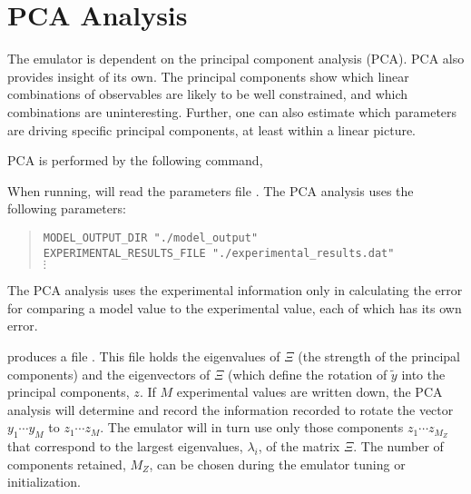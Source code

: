 \section{PCA Analysis}\label{sec:pca}

The emulator is dependent on the principal component analysis (PCA). PCA also provides insight of its own. The principal components show which linear combinations of observables are likely to be well constrained, and which combinations are uninteresting. Further, one can also estimate which parameters are driving specific principal components, at least within a linear picture.

PCA is performed by the following command,


When running,  will read the parameters file . The PCA analysis uses the following parameters:

\vspace*{-8pt}\begin{quote}
{\tt MODEL\_OUTPUT\_DIR "./model\_output"}\\
{\tt EXPERIMENTAL\_RESULTS\_FILE "./experimental\_results.dat"}\\
$\vdots$
\end{quote}\vspace*{-8pt}
The PCA analysis uses the experimental information only in calculating the error for comparing a model value to the experimental value, each of which has its own error.

 produces a file . This file holds the eigenvalues of $\Xi$ (the strength of the principal components) and the eigenvectors of $\Xi$ (which define the rotation of $\tilde{y}$ into the principal components, $z$. If $M$ experimental values are written down, the PCA analysis will determine and record the information recorded to rotate the vector $y_1\cdots y_M$ to $z_1\cdots z_M$. The emulator will in turn use only those components $z_1\cdots z_{M_Z}$ that correspond to the largest eigenvalues, $\lambda_i$, of the matrix $\Xi$. The number of components retained, $M_Z$, can be chosen during the emulator tuning or initialization.

